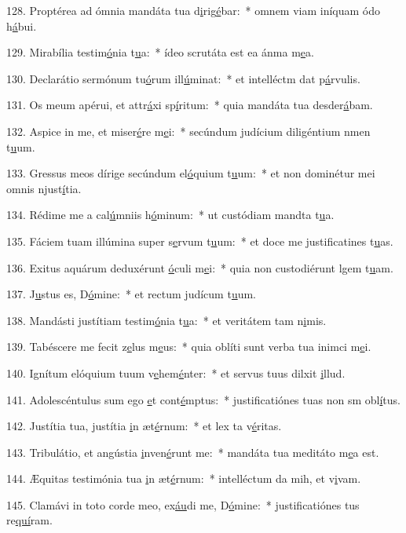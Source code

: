128. Proptérea ad ómnia mandáta tua d\uline{i}rig\uline{é}bar:~* omnem viam iníquam ódo h\uline{á}bui.\par 
129. Mirabília testim\uline{ó}nia t\uline{u}a:~* ídeo scrutáta est ea ánma m\uline{e}a.\par 
130. Declarátio sermónum tu\uline{ó}rum ill\uline{ú}minat:~* et intelléctm dat p\uline{á}rvulis.\par 
131. Os meum apérui, et attr\uline{á}xi sp\uline{í}ritum:~* quia mandáta tua desder\uline{á}bam.\par 
132. Aspice in me, et miser\uline{é}re m\uline{e}i:~* secúndum judícium diligéntium nmen t\uline{u}um.\par 
133. Gressus meos dírige secúndum el\uline{ó}quium t\uline{u}um:~* et non dominétur mei omnis njust\uline{í}tia.\par 
134. Rédime me a cal\uline{ú}mniis h\uline{ó}minum:~* ut custódiam mandta t\uline{u}a.\par 
135. Fáciem tuam illúmina super s\uline{e}rvum t\uline{u}um:~* et doce me justificatines t\uline{u}as.\par 
136. Exitus aquárum deduxérunt \uline{ó}culi m\uline{e}i:~* quia non custodiérunt lgem t\uline{u}am.\par 
137. J\uline{u}stus es, D\uline{ó}mine:~* et rectum judícum t\uline{u}um.\par 
138. Mandásti justítiam testim\uline{ó}nia t\uline{u}a:~* et veritátem tam n\uline{i}mis.\par 
139. Tabéscere me fecit z\uline{e}lus m\uline{e}us:~* quia oblíti sunt verba tua inimci m\uline{e}i.\par 
140. Ignítum elóquium tuum v\uline{e}hem\uline{é}nter:~* et servus tuus dilxit \uline{i}llud.\par 
141. Adolescéntulus sum ego \uline{e}t cont\uline{é}mptus:~* justificatiónes tuas non sm obl\uline{í}tus.\par 
142. Justítia tua, justítia \uline{i}n æt\uline{é}rnum:~* et lex ta v\uline{é}ritas.\par 
143. Tribulátio, et angústia \uline{i}nven\uline{é}runt me:~* mandáta tua meditáto m\uline{e}a est.\par 
144. Æquitas testimónia tua \uline{i}n æt\uline{é}rnum:~* intelléctum da mih, et v\uline{i}vam.\par 
145. Clamávi in toto corde meo, ex\uline{áu}di me, D\uline{ó}mine:~* justificatiónes tus re\uline{quí}ram.\par 
